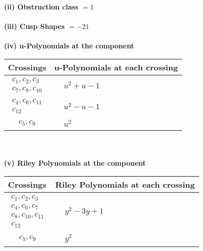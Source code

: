\documentclass[1p]{elsarticle_modified}
\theoremstyle{definition}
\begin{document}
\flushleft \textbf{(ii) Obstruction class $= 1$}\\~\\
\flushleft \textbf{(iii) Cusp Shapes $= -21$}\\~\\
\newpage\renewcommand{\arraystretch}{1}
\flushleft \textbf{(iv) u-Polynomials at the component}\newline \\
\begin{tabular}{m{50pt}|m{274pt}}
Crossings & \hspace{64pt}u-Polynomials at each crossing \\
\hline $$\begin{aligned}c_{1},c_{2},c_{3}\\c_{7},c_{8},c_{10}\end{aligned}$$&$\begin{aligned}
&u^2+u-1
\end{aligned}$\\
\hline $$\begin{aligned}c_{4},c_{6},c_{11}\\c_{12}\end{aligned}$$&$\begin{aligned}
&u^2- u-1
\end{aligned}$\\
\hline $$\begin{aligned}c_{5},c_{9}\end{aligned}$$&$\begin{aligned}
&u^2
\end{aligned}$\\
\hline
\end{tabular}\\~\\
\newpage\renewcommand{\arraystretch}{1}
\flushleft \textbf{(v) Riley Polynomials at the component}\newline \\
\begin{tabular}{m{50pt}|m{274pt}}
Crossings & \hspace{64pt}Riley Polynomials at each crossing \\
\hline $$\begin{aligned}c_{1},c_{2},c_{3}\\c_{4},c_{6},c_{7}\\c_{8},c_{10},c_{11}\\c_{12}\end{aligned}$$&$\begin{aligned}
&y^2-3 y+1
\end{aligned}$\\
\hline $$\begin{aligned}c_{5},c_{9}\end{aligned}$$&$\begin{aligned}
&y^2
\end{aligned}$\\
\hline
\end{tabular}\\~\\
\end{document}
